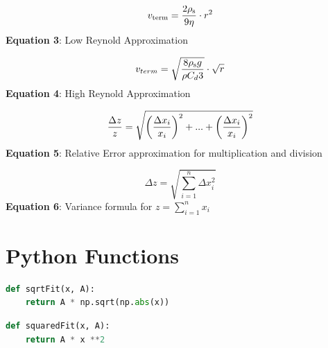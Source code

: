 \documentclass[
	letterpaper
	12pt
]{template}
\newcommand{\bref}[2]{\textbf{\hyperref[#1]{#2}}}
\begin{document}
\begin{minipage}[t]{0.45\textwidth}
	\begin{center}
		\begin{equation}
			\label{lowReynold}
			v_{\rm term}  = {2\rho_{\rm s} \over 9 \eta}\cdot r^2
		\end{equation}
		\textbf{Equation 3}: Low Reynold Approximation
	\end{center}
\end{minipage}
\begin{minipage}[t]{0.45\textwidth}
	\begin{center}
		\begin{equation}
			\label{highReynold}
			v_{term} =\sqrt{8\rho_{\rm s} g\over \rho C_d  3}\cdot \sqrt{r}
		\end{equation}
		\textbf{Equation 4}: High Reynold Approximation
	\end{center}
\end{minipage}


\begin{minipage}[t]{0.45\textwidth}
	\begin{center}
		\begin{equation}
			\label{relErr}
			{\Delta z\over z} = \sqrt{\left({\Delta x_i \over x_i}\right)^2 +...+ \left({\Delta x_i \over x_i}\right)^2}
		\end{equation}
		\textbf{Equation 5}: Relative Error approximation for multiplication and division
	\end{center}
\end{minipage}
\hfill
\begin{minipage}[t]{0.45\textwidth}
	\begin{center}
		\begin{equation}
			\label{addErr}
			\Delta z = \sqrt{\sum_{i=1}^n \Delta x_i^2}
		\end{equation}
		\textbf{Equation 6}: Variance formula for $z=\sum_{i=1}^n x_i$
	\end{center}
\end{minipage}

\section{Python Functions}

\begin{lstlisting}[caption={\label{sqrtFit}  Function used to fit the high reynolds number model \bref{highReynold}{Equation 4}},
captionpos=b,language=python]
def sqrtFit(x, A):
    return A * np.sqrt(np.abs(x))
\end{lstlisting}
\begin{lstlisting}[caption={\label{squaredFit}  Function used to fit the low reynolds number model \bref{lowReynold}{Equation 3}},
	captionpos=b,language=python]
def squaredFit(x, A):
	return A * x **2
\end{lstlisting}

\newpage


\end{document}
